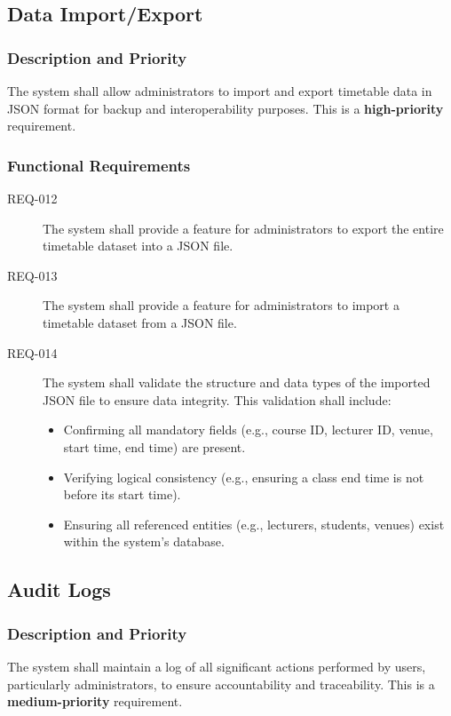 \documentclass[11pt, a4paper]{article}
\begin{document}
\subsection{Data Import/Export}
\label{sec:import_export}
\subsubsection{Description and Priority}
The system shall allow administrators to import and export timetable data in JSON format for backup and interoperability purposes. This is a \textbf{high-priority} requirement.

\subsubsection{Functional Requirements}
\begin{description}
    \item[REQ-012] The system shall provide a feature for administrators to export the entire timetable dataset into a JSON file.
    \item[REQ-013] The system shall provide a feature for administrators to import a timetable dataset from a JSON file.
    \item[REQ-014] The system shall validate the structure and data types of the imported JSON file to ensure data integrity. This validation shall include:
    \begin{itemize}
        \item Confirming all mandatory fields (e.g., course ID, lecturer ID, venue, start time, end time) are present.
        \item Verifying logical consistency (e.g., ensuring a class end time is not before its start time).
        \item Ensuring all referenced entities (e.g., lecturers, students, venues) exist within the system's database.
    \end{itemize}
\end{description}

\subsection{Audit Logs}
\label{sec:audit_logs}
\subsubsection{Description and Priority}
The system shall maintain a log of all significant actions performed by users, particularly administrators, to ensure accountability and traceability. This is a \textbf{medium-priority} requirement.
\end{document}
